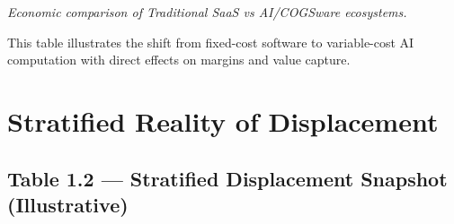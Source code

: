 \documentclass[
  a4paper,
]{report}
\begin{document}
\emph{Economic comparison of Traditional SaaS vs AI/COGSware
ecosystems.}

\begin{tcolorbox}[enhanced jigsaw, toprule=.15mm, rightrule=.15mm, breakable, opacitybacktitle=0.6, colframe=quarto-callout-important-color-frame, colback=white, titlerule=0mm, arc=.35mm, leftrule=.75mm, opacityback=0, colbacktitle=quarto-callout-important-color!10!white, bottomrule=.15mm, coltitle=black, toptitle=1mm, bottomtitle=1mm, title=\textcolor{quarto-callout-important-color}{\faExclamation}\hspace{0.5em}{Important}, left=2mm]

This table illustrates the shift from fixed-cost software to
variable-cost AI computation with direct effects on margins and value
capture.

\end{tcolorbox}

\section{Stratified Reality of
Displacement}\label{stratified-reality-of-displacement}

\subsection{Table 1.2 --- Stratified Displacement Snapshot
(Illustrative)}\label{table-1.2-stratified-displacement-snapshot-illustrative}
\end{document}
